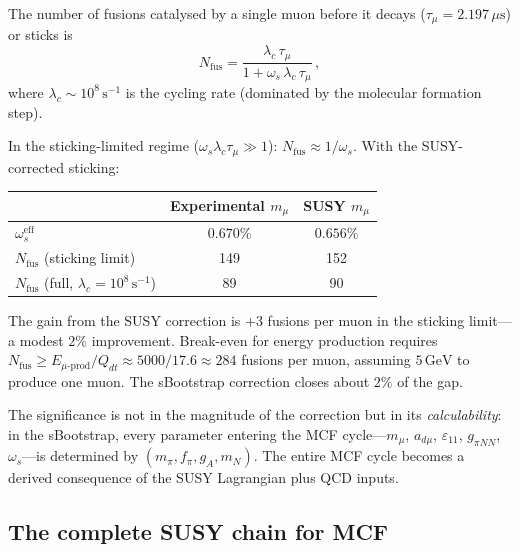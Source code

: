 \documentclass[12pt,a4paper]{article}
\newcommand{\GeV}{\,\text{GeV}}
\newcommand{\fpi}{f_\pi}
\begin{document}
The number of fusions catalysed by a single muon before it decays
($\tau_\mu = 2.197\,\mu\text{s}$) or sticks is
\begin{equation}
  N_{\text{fus}} = \frac{\lambda_c\,\tau_\mu}
  {1 + \omega_s\,\lambda_c\,\tau_\mu}\,,
\end{equation}
where $\lambda_c \sim 10^8\,\text{s}^{-1}$ is the cycling rate
(dominated by the molecular formation step).

In the sticking-limited regime ($\omega_s\lambda_c\tau_\mu \gg 1$):
$N_{\text{fus}} \approx 1/\omega_s$.  With the SUSY-corrected
sticking:

\begin{center}
\begin{tabular}{lcc}
\toprule
 & Experimental $m_\mu$ & SUSY $m_\mu$ \\
\midrule
$\omega_s^{\text{eff}}$ & $0.670\%$ & $0.656\%$ \\
$N_{\text{fus}}$ (sticking limit) & 149 & 152 \\
$N_{\text{fus}}$ (full, $\lambda_c = 10^8\,\text{s}^{-1}$) & 89 & 90 \\
\bottomrule
\end{tabular}
\end{center}

The gain from the SUSY correction is $+3$ fusions per muon in the
sticking limit---a modest $2\%$ improvement.  Break-even for energy
production requires $N_{\text{fus}} \geq E_{\mu\text{-prod}}/Q_{dt}
\approx 5000/17.6 \approx 284$ fusions per muon, assuming
$5\GeV$ to produce one muon.  The sBootstrap correction closes
about $2\%$ of the gap.

The significance is not in the magnitude of the correction but in
its \emph{calculability}: in the sBootstrap, every parameter entering
the MCF cycle---$m_\mu$, $a_{d\mu}$, $\varepsilon_{11}$,
$g_{\pi NN}$, $\omega_s$---is determined by $(m_\pi, \fpi, g_A, m_N)$.
The entire MCF cycle becomes a derived consequence of the SUSY
Lagrangian plus QCD inputs.

\subsection{The complete SUSY chain for MCF}
\end{document}
